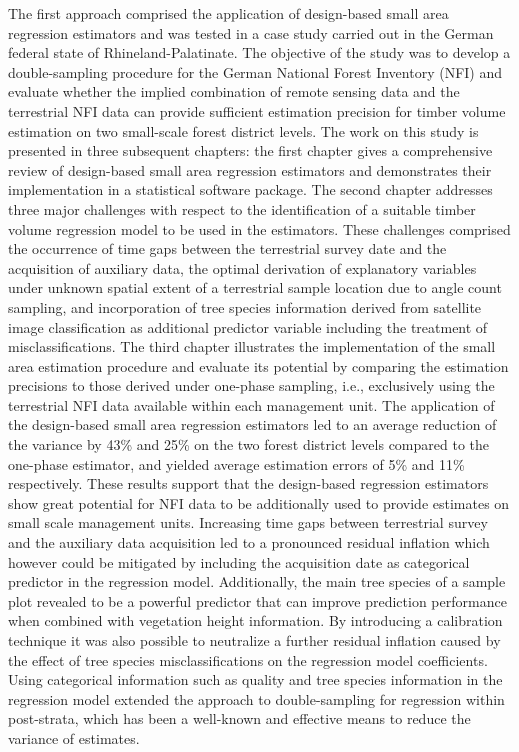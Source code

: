 The first approach comprised the application of design-based small area regression estimators and was tested in a case study carried out in the German federal state of Rhineland-Palatinate. The objective of the study was to develop a double-sampling procedure for the German National Forest Inventory (NFI) and evaluate whether the implied combination of remote sensing data and the terrestrial NFI data can provide sufficient estimation precision for timber volume estimation on two small-scale forest district levels. The work on this study is presented in three subsequent chapters: the first chapter gives a comprehensive review of design-based small area regression estimators and demonstrates their implementation in a statistical software package. The second chapter addresses three major challenges with respect to the identification of a suitable timber volume regression model to be used in the estimators. These challenges comprised the occurrence of time gaps between the terrestrial survey date and the acquisition of auxiliary data, the optimal derivation of explanatory variables under unknown spatial extent of a terrestrial sample location due to angle count sampling, and incorporation of tree species information derived from satellite image classification as additional predictor variable including the treatment of misclassifications. The third chapter illustrates the implementation of the small area estimation procedure and evaluate its potential by comparing the estimation precisions to those derived under one-phase sampling, i.e., exclusively using the terrestrial NFI data available within each management unit. The application of the design-based small area regression estimators led to an average reduction of the variance by 43\% and 25\% on the two forest district levels compared to the one-phase estimator, and yielded average estimation errors of 5\% and 11\% respectively. These results support that the design-based regression estimators show great potential for NFI data to be additionally used to provide estimates on small scale management units. Increasing time gaps between terrestrial survey and the auxiliary data acquisition led to a pronounced residual inflation which however could be mitigated by including the acquisition date as categorical predictor in the regression model. Additionally, the main tree species of a sample plot revealed to be a powerful predictor that can improve prediction performance when combined with vegetation height information. By introducing a calibration technique it was also possible to neutralize a further residual inflation caused by the effect of tree species misclassifications on the regression model coefficients. Using categorical information such as quality and tree species information in the regression model extended the approach to double-sampling for regression within post-strata, which has been a well-known and effective means to reduce the variance of estimates.\par

